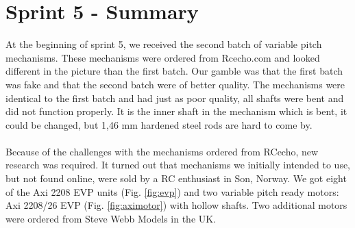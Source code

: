 \section{Sprint 5 - Summary}

At the beginning of sprint 5, we received the second batch of variable pitch mechanisms. These mechanisms were ordered from Rcecho.com and looked different in the picture than the first batch. Our gamble was that the first batch was fake and that the second batch were of better quality.
The mechanisms were identical to the first batch and had just as poor quality, all shafts were bent and did not function properly. It is the inner shaft in the mechanism which is bent, it could be changed, but 1,46 mm hardened steel rods are hard to come by. \\ 
\\ 
Because of the challenges with the mechanisms ordered from RCecho, new research was required. It turned out that mechanisms we initially intended to use, but not found online, were sold by a RC enthusiast in Son, Norway. We got eight of the Axi 2208 EVP units (Fig. \ref{fig:evp}) and two variable pitch ready motors: Axi 2208/26 EVP (Fig. \ref{fig:aximotor}) with hollow shafts. Two additional motors were ordered from Steve Webb Models in the UK. \\
